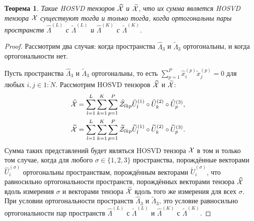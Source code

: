 \documentclass[specialist,
    substylefile = spbu_report.rtx,
    subf,href,colorlinks=true, 12pt]{disser}
\theoremstyle{plain}
\newtheorem{theorem}{Теорема}
\theoremstyle{definition}
\theoremstyle{remark}
\begin{document}
    \begin{theorem}
        Такие \emph{HOSVD} тензоров $\widehat{\mathcal{X}}$ и $\widetilde{\mathcal{X}}$, что их сумма
        является \emph{HOSVD} тензора $\mathcal{X}$ существуют тогда и только тогда, когда ортогональны пары пространств
        $\widehat{\Lambda}^{(L)}$ с $\widetilde{\Lambda}^{(L)}$ и $\widehat{\Lambda}^{(K)}$ с
        $\widetilde{\Lambda}^{(K)}$.
    \end{theorem}
    \begin{proof}
        Рассмотрим два случая: когда пространства $\widehat{\Lambda}_3$ и $\widetilde{\Lambda}_3$ ортогональны,
        и когда ортогональности нет.
        
        Пусть пространства $\widehat{\Lambda}_3$ и $\widetilde{\Lambda}_3$ ортогональны, то есть
        $\sum_{p=1}^P \hat{x}_i^{(p)}\tilde{x}_j^{(p)} = 0$ для любых $i, j \in \overline{1:N}$.
        Рассмотрим HOSVD тензоров $\widehat{\mathcal{X}}$ и $\widetilde{\mathcal{X}}$:
        \begin{gather}
            \widehat{\mathcal{X}}=\sum_{l=1}^{L} \sum_{k=1}^{K} \sum_{p=1}^{P} \widehat{\mathcal{Z}}_{lkp} \widehat{U}^{(1)}_{l}
                \circ \widehat{U}^{(2)}_{k} \circ \widehat{U}^{(3)}_{p},\\
            \widetilde{\mathcal{X}}=\sum_{l=1}^{L} \sum_{k=1}^{K} \sum_{p=1}^{P} \widetilde{\mathcal{Z}}_{lkp} \widetilde{U}^{(1)}_{l}
                \circ \widetilde{U}^{(2)}_{k} \circ \widetilde{U}^{(3)}_{p}.
        \end{gather}
        Сумма таких представлений будет являться HOSVD тензора $\mathcal{X}$ в том и только том случае,
        когда для любого $\sigma\in \{1, 2, 3\}$ пространства, порождённые векторами 
        $\widehat{U}^{(\sigma)}_{i}$ ортогональны пространствам, порождённым векторами
        $\widetilde{U}^{(\sigma)}_{i}$, что равносильно ортогональности пространств, порождённых
        векторами тензора $\widehat{\mathcal{X}}$ вдоль измерения $\sigma$ и векторами тензора 
        $\widetilde{\mathcal{X}}$ вдоль того же измерения для всех $\sigma$. При условии ортогональности
        пространств $\widehat{\Lambda}_3$ и $\widetilde{\Lambda}_3$, это условие равносильно ортогональности пар
        пространств $\widehat{\Lambda}^{(L)}$ с $\widetilde{\Lambda}^{(L)}$ и 
        $\widehat{\Lambda}^{(K)}$ с $\widetilde{\Lambda}^{(K)}$.
        

\end{proof}
\end{document}
